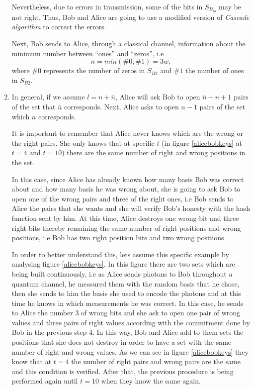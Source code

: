 \begin{enumerate}
      Nevertheless, due to errors in transmission, some of the bits in $S_{B_{rb}}$ may be not right. Thus, Bob and Alice are going to use a modified version of \textit{Cascade algorithm} to correct the errors.

      Next, Bob sends to Alice, through a classical channel, information about the minimum number between ``ones'' and ``zeros'', i.e $$n=min(\#0,\#1)=3 w,$$ where $\#0$ represents the number of zeros in $S_{B2}$ and $\#1$ the number of ones in $S_{B2}$.

  \item In general, if we assume $l=n+\bar{n}$, Alice will ask Bob to open $\bar{n}-n+1$ pairs of the set that $\bar{n}$ corresponds. Next, Alice asks to open $n-1$ pairs of the set which $n$ corresponds.

      It is important to remember that Alice never knows which are the wrong or the right pairs. She only knows that at specific $t$ (in figure \ref{alicebobkeys} at $t=4$ and $t=10$) there are the same number of right and wrong positions in the set.

      In this case, since Alice has already known how many basis Bob was correct about and how many basis he was wrong about, she is going to ask Bob to open one of the wrong pairs and three of the right ones, i.e Bob sends to Alice the pairs that she wants and she will verify Bob's honesty with the hash function sent by him. At this time, Alice destroys one wrong bit and three right bits thereby remaining the same number of right positions and wrong positions, i.e Bob has two right position bits and two wrong positions.

      In order to better understand this, lets assume this specific example by analysing figure \ref{alicebobkeys}. In this figure there are two sets which are being built continuously, i.e as Alice sends photons to Bob throughout a quantum channel, he measured them with the random basis that he chose, then she sends to him the basis she used to encode the photons and at this time he knows in which measurements he was correct. In this case, he sends to Alice the number 3 of wrong bits and she ask to open one pair of wrong values and three pairs of right values according with the commitment done by Bob in the previous step 4. In this way, Bob and Alice add to them sets the positions that she does not destroy in order to have a set with the same number of right and wrong values. As we can see in figure \ref{alicebobkeys} they know that at $t=4$ the number of right pairs and wrong pairs are the same and this condition is verified. After that, the previous procedure is being performed again until $t=10$ when they know the same again.


\end{enumerate}
